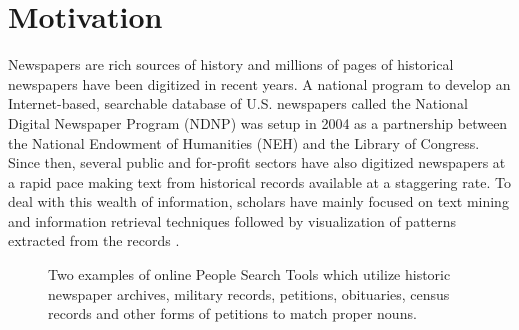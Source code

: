 


\section {Motivation}

Newspapers are rich sources of history and millions of pages of historical newspapers have been digitized \cite{Allen_10} in recent years. A national program to develop an Internet-based, searchable database of U.S. newspapers called the National Digital Newspaper Program (NDNP) was setup in 2004 as a partnership between the National Endowment of Humanities (NEH) and the Library of Congress. Since then, several public and for-profit sectors have also digitized newspapers at a rapid pace making text from historical records available at a staggering rate. To deal with this wealth of information, scholars have mainly focused on text mining and information retrieval techniques followed by visualization of patterns extracted from the records \cite{McKeown_1995, Radev99c, mckeown2002tracking, dutta2011learning, Berberich2007, khurdiya2011multi, shahaf2010connecting}. 


\begin{figure}[t]
\begin{center}
\caption{Two examples of online People Search Tools which utilize historic newspaper archives, military records, petitions, obituaries, census records and other forms of petitions to match proper nouns.}
\label{figSearch}
\end{center}
\end{figure}

